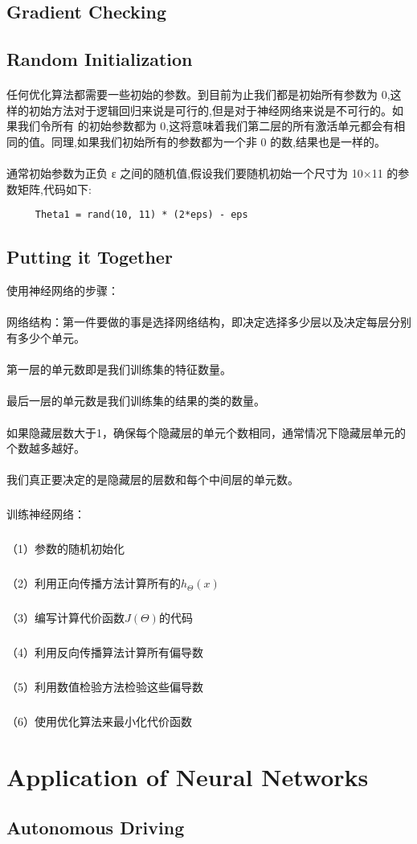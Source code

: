 \documentclass{article}
\begin{document}
\begin{CJK}{UTF8}{gbsn}
\subsection{Gradient Checking}
\subsection{Random Initialization}
\paragraph{ }
任何优化算法都需要一些初始的参数。到目前为止我们都是初始所有参数为 0,这样的初始方法对于逻辑回归来说是可行的,但是对于神经网络来说是不可行的。如果我们令所有
的初始参数都为 0,这将意味着我们第二层的所有激活单元都会有相同的值。同理,如果我们初始所有的参数都为一个非 0 的数,结果也是一样的。
\paragraph{}
通常初始参数为正负 ε 之间的随机值,假设我们要随机初始一个尺寸为 10×11 的参数矩阵,代码如下:
    \begin{verbatim}
     Theta1 = rand(10, 11) * (2*eps) - eps
    \end{verbatim}
\subsection{Putting it Together}
使用神经网络的步骤：
\paragraph{}
网络结构：第一件要做的事是选择网络结构，即决定选择多少层以及决定每层分别有多少个单元。
\paragraph{}
第一层的单元数即是我们训练集的特征数量。
\paragraph{}
最后一层的单元数是我们训练集的结果的类的数量。
\paragraph{}
如果隐藏层数大于1，确保每个隐藏层的单元个数相同，通常情况下隐藏层单元的个数越多越好。
\paragraph{}
我们真正要决定的是隐藏层的层数和每个中间层的单元数。
\subparagraph{}
训练神经网络：
\subparagraph{}
（1）参数的随机初始化
\subparagraph{}
（2）利用正向传播方法计算所有的$h_\Theta(x)$
\subparagraph{}
（3）编写计算代价函数$J(\Theta)$的代码
\subparagraph{}
（4）利用反向传播算法计算所有偏导数
\subparagraph{}
（5）利用数值检验方法检验这些偏导数
\subparagraph{}
（6）使用优化算法来最小化代价函数
\section{Application of Neural Networks}
\subsection{Autonomous Driving}
\end{CJK}
\end{document}
